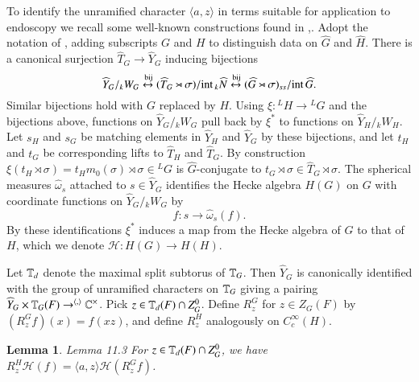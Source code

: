 \documentclass[11pt]{amsart}
\theoremstyle{plain}
\newtheorem{lemma}[theorem]{Lemma}
\theoremstyle{definition}
\def\what#1{\widehat#1}
\def\bij{\buildrel{}\operatorname{bij}\over\leftrightarrow}
\def\BOREL{2}
\def\MACDONALD{23}
\begin{document}

To identify the unramified character $\langle a,z\rangle$ in terms suitable
for application to endoscopy we recall some well-known constructions
found in \cite{\BOREL},\cite{\MACDONALD}.   Adopt the notation
of \cite{\BOREL}, adding subscripts $G$ and $H$ to distinguish
data on $\what G$ and $\what H$.  There is a canonical surjection
$\what T_G\to \what Y_G$ inducing bijections
$$\what Y_G/{}_kW_G \bij (\what T_G\rtimes\sigma)/\text{int}\,{}_k\what N
	\bij (\what G\rtimes\sigma)_{ss}/\text{int}\,\what G.$$
Similar bijections hold with $G$ replaced by $H$.
Using $\xi:{}^LH\to{}^LG$ and the bijections above, functions on 
$\what Y_G/{}_kW_G$ pull back by $\xi^*$ to functions on $\what Y_H/{}_kW_H$.
Let $s_H$ and $s_G$ be matching elements in $\what Y_H$ and $\what Y_G$ by 
these bijections, and let $t_H$ and $t_G$ be corresponding lifts to 
$\what T_H$ and $\what T_G$.  By construction $\xi(t_H\rtimes\sigma) =
t_Hm_0(\sigma)\rtimes\sigma\in {}^LG$ is $\what G$-conjugate to $t_G\rtimes\sigma
\in \what T_G\rtimes \sigma$.  The spherical measures $\what \omega_s$ attached
to $s\in \what Y_G$ identifies the Hecke algebra $H(G)$ on $G$ with coordinate
functions on $\what Y_G/{}_kW_G$ by
$$f: s\to \what\omega_s(f).$$
By these identifications $\xi^*$ induces a map from the Hecke algebra of $G$
to that of $H$, which we denote $\mathcal{ H}:H(G)\to H(H)$.

Let $\Bbb T_d$ denote the maximal split subtorus of $\Bbb T_G$.
Then $\what Y_G$ is canonically identified with the group of
unramified characters on $\Bbb T_G$ giving a pairing
$\what Y_G \times \Bbb T_G(F) \to^{\langle,\rangle} \Bbb C^\times$.
Pick $z\in \Bbb T_d(F) \cap Z_G^0$.  
Define $R^G_z$ for $z\in Z_G(F)$ by $(R^G_zf)(x) = f(xz)$, and
define $R_z^H$ analogously on $C_c^\infty(H)$.

\begin{lemma}{Lemma 11.3}  For $z\in\Bbb T_d(F) \cap Z_G^0$,
we have $R_z^H\mathcal{ H}(f) = \langle a,z\rangle\mathcal{ H}(R_z^Gf)$.
\end{lemma}
\end{document}
